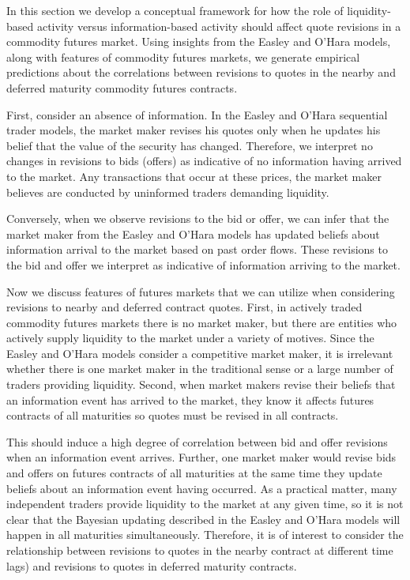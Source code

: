 \documentclass[]{elsarticle} %
\begin{document}
In this section we develop a conceptual framework for how the role of
liquidity-based activity versus information-based activity should affect
quote revisions in a commodity futures market. Using insights from the
Easley and O'Hara models, along with features of commodity futures
markets, we generate empirical predictions about the correlations
between revisions to quotes in the nearby and deferred maturity
commodity futures contracts.

First, consider an absence of information. In the Easley and O'Hara
sequential trader models, the market maker revises his quotes only when
he updates his belief that the value of the security has changed.
Therefore, we interpret no changes in revisions to bids (offers) as
indicative of no information having arrived to the market. Any
transactions that occur at these prices, the market maker believes are
conducted by uninformed traders demanding liquidity.

Conversely, when we observe revisions to the bid or offer, we can infer
that the market maker from the Easley and O'Hara models has updated
beliefs about information arrival to the market based on past order
flows. These revisions to the bid and offer we interpret as indicative
of information arriving to the market.

Now we discuss features of futures markets that we can utilize when
considering revisions to nearby and deferred contract quotes. First, in
actively traded commodity futures markets there is no market maker, but
there are entities who actively supply liquidity to the market under a
variety of motives. Since the Easley and O'Hara models consider a
competitive market maker, it is irrelevant whether there is one market
maker in the traditional sense or a large number of traders providing
liquidity. Second, when market makers revise their beliefs that an
information event has arrived to the market, they know it affects
futures contracts of all maturities so quotes must be revised in all
contracts.

This should induce a high degree of correlation between bid and offer
revisions when an information event arrives. Further, one market maker
would revise bids and offers on futures contracts of all maturities at
the same time they update beliefs about an information event having
occurred. As a practical matter, many independent traders provide
liquidity to the market at any given time, so it is not clear that the
Bayesian updating described in the Easley and O'Hara models will happen
in all maturities simultaneously. Therefore, it is of interest to
consider the relationship between revisions to quotes in the nearby
contract at different time lags) and revisions to quotes in deferred
maturity contracts.
\end{document}
